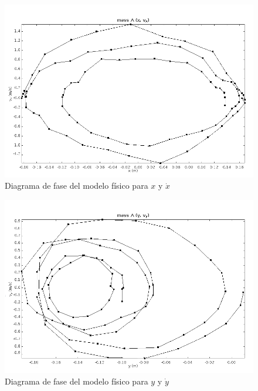\begin{figure}[h]
 \centering
 \includegraphics[scale=0.45]{./img/tracker_poc_phasediagram_x_vx.png}
 \caption{Diagrama de fase del modelo físico para $x$ y $\dot{x}$}
 \label{fig: tracker phase diagram x vx}
\end{figure}

\begin{figure}[h]
 \centering
 \includegraphics[scale=0.45]{./img/tracker_poc_phasediagram_y_vy.png}
 \caption{Diagrama de fase del modelo físico para $y$ y $\dot{y}$}
 \label{fig: tracker phase diagram y vy}
\end{figure}
